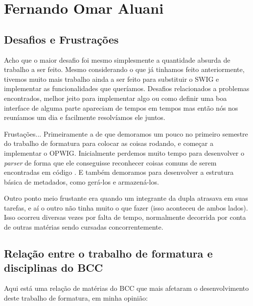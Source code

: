 \chapter{Fernando Omar Aluani}
\label{cap:omar}

\section{Desafios e Frustrações}
\label{cap:omar:desafios_frustracoes}

Acho que o maior desafio foi mesmo simplesmente a quantidade absurda de trabalho a
ser feito. Mesmo considerando o que já tinhamos feito anteriormente, tivemos muito
mais trabalho ainda a ser feito para substituir o SWIG e implementar as funcionalidades
que queríamos. Desafios relacionados a problemas encontrados, melhor jeito para
implementar algo ou como definir uma boa interface de alguma parte apareciam de
tempos em tempos mas então nós nos reuníamos um dia e facilmente resolvíamos ele juntos.

Frustações... Primeiramente a de que demoramos um pouco no primeiro semestre do 
trabalho de formatura para colocar as coisas rodando, e começar a implementar o 
OPWIG. Inicialmente perdemos muito tempo para desenvolver o \textit{parser}
de forma que ele conseguisse reconhecer coisas comuns de serem encontradas
em código \CXX{}. E também demoramos para desenvolver a estrutura básica de 
metadados, como gerá-los e armazená-los.

Outro ponto meio frustante era quando um integrante da dupla atrasava em suas tarefas,
e aí o outro não tinha muito o que fazer (isso aconteceu de ambos lados). Isso
ocorreu diversas vezes por falta de tempo, normalmente decorrida por conta de
outras matérias sendo cursadas concorrentemente.

\section{Relação entre o trabalho de formatura e disciplinas do BCC}
\label{cap:omar:relacao_disciplinas_bcc}

Aqui está uma relação de matérias do BCC que mais afetaram o desenvolvimento
deste trabalho de formatura, em minha opinião: \\

